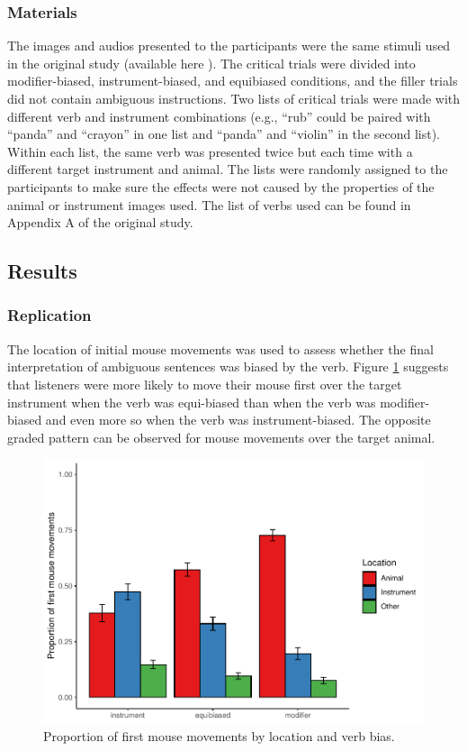\documentclass[
  man,floatsintext]{apa6}
\begin{document}
\subsubsection{Materials}\label{materials-1}

The images and audios presented to the participants were the same
stimuli used in the original study (available here ). The critical
trials were divided into modifier-biased, instrument-biased, and
equibiased conditions, and the filler trials did not contain ambiguous
instructions. Two lists of critical trials were made with different verb
and instrument combinations (e.g., ``rub'' could be paired with ``panda''
and ``crayon'' in one list and ``panda'' and ``violin'' in the second list).
Within each list, the same verb was presented twice but each time with a
different target instrument and animal. The lists were randomly assigned
to the participants to make sure the effects were not caused by the
properties of the animal or instrument images used. The list of verbs
used can be found in Appendix A of the original study.

\subsection{Results}\label{results-3}

\subsubsection{Replication}\label{replication-1}

The location of initial mouse movements was used to assess whether the final interpretation of ambiguous sentences was biased by the verb. Figure \ref{fig:E4-mouse-moves-fig} suggests that listeners were more likely to move their mouse first over the target instrument when the verb was equi-biased than when the verb was modifier-biased and even more so when the verb was instrument-biased. The opposite graded pattern can be observed for mouse movements over the target animal.

\begin{figure}
\centering
\includegraphics{manuscript_files/figure-latex/E4-mouse-moves-fig-1.pdf}
\caption{\label{fig:E4-mouse-moves-fig}Proportion of first mouse movements by location and verb bias.}
\end{figure}
\end{document}
